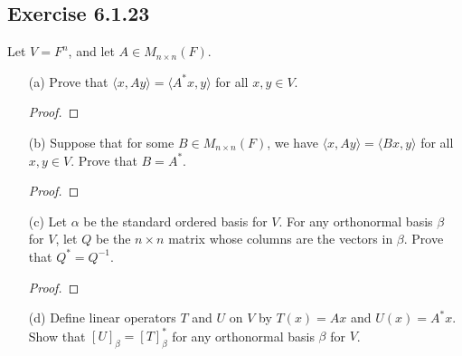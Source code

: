 \subsection*{Exercise 6.1.23} Let \( V = F^{n} \), and let \( A \in {M}_{n \times n }(F) \). 
\begin{enumerate}
    \item[(a)] Prove that \( \langle x  , Ay \rangle = \langle A^{*} x  , y \rangle \) for all \( x,y \in V  \).
        \begin{proof}
        
        \end{proof}
    \item[(b)] Suppose that for some \( B \in {M}_{n \times n}(F) \), we have \( \langle x  , Ay \rangle = \langle B x  , y \rangle \) for all \( x, y \in V  \). Prove that \( B = A^{*} \).
        \begin{proof}
        
        \end{proof}
    \item[(c)] Let \( \alpha  \) be the standard ordered basis for \( V  \). For any orthonormal basis \( \beta  \) for \( V  \), let \( Q  \) be the \( n \times n  \) matrix whose columns are the vectors in \( \beta  \). Prove that \( Q^{*} = Q^{-1}  \).
        \begin{proof}
        
        \end{proof}
    \item[(d)] Define linear operators \( T  \) and \( U  \) on \( V  \) by \( T(x) = Ax  \) and \( U(x) = A^{*}x  \). Show that \( [U]_{\beta} = [T]^{*}_{\beta} \) for any orthonormal basis \( \beta  \) for \( V  \).
\end{enumerate}
